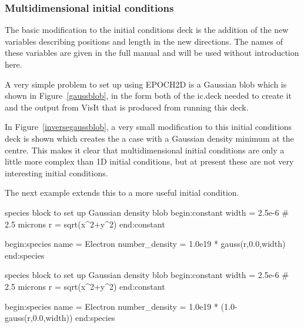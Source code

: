 \subsubsection{Multidimensional initial conditions}

The basic modification to the {\EPOCH} initial conditions deck is the addition
of the new variables describing positions and length in the new directions. The
names of these variables are given in the full manual and will be used without
introduction here.


A very simple problem to set up using EPOCH2D is a Gaussian blob which is
shown in Figure~\ref{gaussblob}, in the form both of the ic.deck needed to
create it and the output from VisIt that is produced from running this deck.


In Figure~\ref{inversegaussblob}, a very small modification to this initial
conditions deck is shown which creates the a case with a Gaussian density
minimum at the centre. This makes it clear that multidimensional initial
conditions are only a little more complex than 1D initial conditions, but at
present these are not very interesting initial conditions.

The next example extends this to a more useful initial condition.\\

\begin{nbboxverbatim}{species block to set up Gaussian density blob}
begin:constant
   width = 2.5e-6 # 2.5 microns
   r = sqrt(x^2+y^2)
end:constant

begin:species
   name = Electron
   number_density = 1.0e19 * gauss(r,0.0,width)
end:species
\end{nbboxverbatim}
%
\begin{nbboxverbatim}{species block to set up Gaussian density blob}
begin:constant
   width = 2.5e-6 # 2.5 microns
   r = sqrt(x^2+y^2)
end:constant

begin:species
   name = Electron
   number_density = 1.0e19 * (1.0-gauss(r,0.0,width))
end:species
\end{nbboxverbatim}

